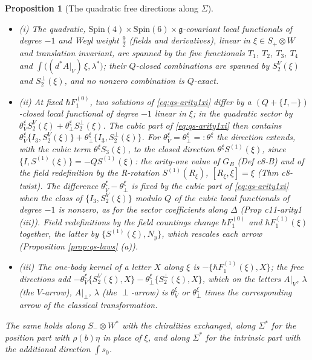 \documentclass[11pt]{article}
\numberwithin{equation}{section}
\theoremstyle{plain}
\newtheorem{proposition}[theorem]{Proposition}
\theoremstyle{definition}
\newcommand{\Ap}{A|_{\perp}}
\newcommand{\AV}{A|_V}
\begin{document}
\begin{proposition}[The quadratic free directions along $\Sigma$]
\label{prop:qs-freexi}
\begin{itemize}
\item (i) The quadratic, $\mathrm{Spin}(4)\times\mathrm{Spin}(6)\times\mathfrak g$-covariant local functionals of degree $-1$ and Weyl weight $\tfrac92$ (fields and derivatives), linear in $\xi\in S_+\otimes W$ and translation invariant, are spanned by the five functionals $T_1$, $T_2$, $T_3$, $T_4$ and $\int\big((d^*A|_V)\,\xi,\lambda^*\big)$; their $Q$-closed combinations are spanned by $S^V_2(\xi)$ and $S^\perp_2(\xi)$, and no nonzero combination is $Q$-exact.
\item (ii) At fixed $\hbar F_1^{(0)}$, two solutions of \eqref{eq:qs-arity1xi} differ by a $(Q+\{I,-\})$-closed local functional of degree $-1$ linear in $\xi$; in the quadratic sector by $\theta^\xi_VS^V_2(\xi)+\theta^\xi_\perp S^\perp_2(\xi)$. The cubic part of \eqref{eq:qs-arity1xi} then contains $\theta^\xi_V\{I_3,S^V_2(\xi)\}+\theta^\xi_\perp\{I_3,S^\perp_2(\xi)\}$. For $\theta^\xi_V=\theta^\xi_\perp=:\theta^\xi$ the direction extends, with the cubic term $\theta^\xi S_3(\xi)$, to the closed direction $\theta^\xi S^{(1)}(\xi)$, since $\{I,S^{(1)}(\xi)\}=-QS^{(1)}(\xi)$: the arity-one value of $G_B$ (Def c8-B) and of the field redefinition by the R-rotation $S^{(1)}(R_\xi)$, $[R_\xi,\xi]=\xi$ (Thm c8-twist). The difference $\theta^\xi_V-\theta^\xi_\perp$ is fixed by the cubic part of \eqref{eq:qs-arity1xi} when the class of $\{I_3,S^V_2(\xi)\}$ modulo $Q$ of the cubic local functionals of degree $-1$ is nonzero, as for the sector coefficients along $\Delta$ (Prop c11-arity1 (iii)). Field redefinitions by the field countings change $\hbar F_1^{(0)}$ and $\hbar F_1^{(1)}(\xi)$ together, the latter by $\{S^{(1)}(\xi),N_y\}$, which rescales each arrow (Proposition \ref{prop:qs-laws} (a)).
\item (iii) The one-body kernel of a letter $X$ along $\xi$ is $-\{\hbar F_1^{(1)}(\xi),X\}$; the free directions add $-\theta^\xi_V\{S^V_2(\xi),X\}-\theta^\xi_\perp\{S^\perp_2(\xi),X\}$, which on the letters $\AV$, $\lambda$ (the $V$-arrow), $\Ap$, $\lambda$ (the $\perp$-arrow) is $\theta^\xi_V$ or $\theta^\xi_\perp$ times the corresponding arrow of the classical transformation.
\end{itemize}
The same holds along $S_-\otimes W^*$ with the chiralities exchanged, along $\Sigma^*$ for the position part with $\rho(b)\eta$ in place of $\xi$, and along $\Sigma^*$ for the intrinsic part with the additional direction $\int s_0$.
\end{proposition}
\end{document}

